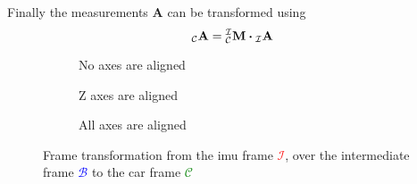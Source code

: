 Finally the measurements $\mathbf{A}$ can be transformed using
\begin{equation}
    \vincs{A}{c} = \mtf{i}{c} \vdot \vincs{A}{i}
\end{equation}
\begin{figure}[htb]
    \centering
    \begin{subfigure}[b]{0.3\textwidth}
        \centering
        
        \caption{No axes are aligned}
        \label{fig:tikz_frame_transformation_init}
    \end{subfigure}
    \hfill
    \begin{subfigure}[b]{0.3\textwidth}
        \centering
        
        \caption{Z axes are aligned}
        \label{fig:tikz_frame_transformation_intermediate}
    \end{subfigure}
    \hfill
    \begin{subfigure}[b]{0.3\textwidth}
        \centering
        
        \caption{All axes are aligned}
        \label{fig:tikz_frame_transformation_final}
    \end{subfigure}
    \caption[Frame transformation]{Frame transformation from the \gls{imu} frame \textcolor{red}{$\mathcal{I}$}, over the intermediate frame \textcolor{blue}{$\mathcal{B}$} to the car frame \textcolor{green}{$\mathcal{C}$}}
    \label{fig:tikz_frame_transformation}
\end{figure}


